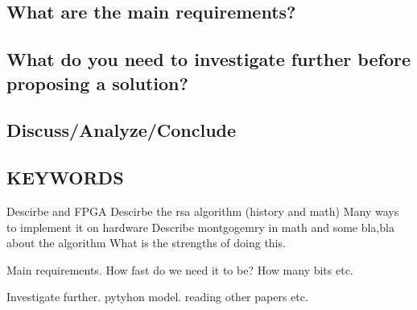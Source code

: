 \subsection{What are the main requirements?}
\subsection{What do you need to investigate further before proposing a solution?}
\subsection{Discuss/Analyze/Conclude}


\subsection{KEYWORDS}
Descirbe and FPGA
Descirbe the rsa algorithm (history and math)
Many ways to implement it on hardware
Describe montgogemry in math and some bla,bla about the algorithm
What is the strengths of doing this.

Main requirements. How fast do we need it to be? How many bits etc.

Investigate further. pytyhon model. reading other papers etc.
